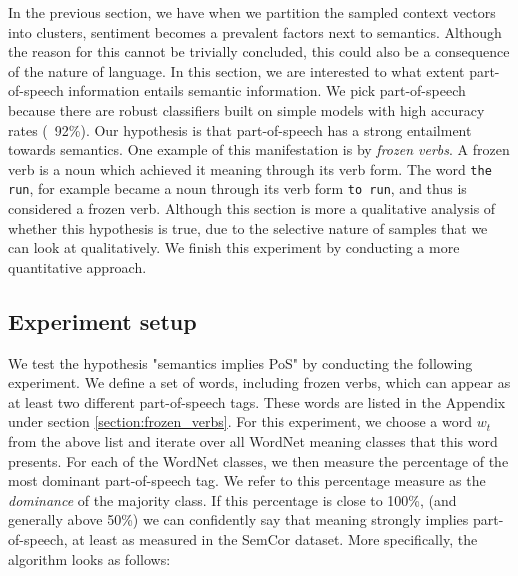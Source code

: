 \documentclass[a4paper,12pt,twoside,openright]{report}
\begin{document}
In the previous section, we have when we partition the sampled context vectors into clusters, sentiment becomes a prevalent factors next to semantics.
Although the reason for this cannot be trivially concluded, this could also be a consequence of the nature of language.
In this section, we are interested to what extent part-of-speech information entails semantic information.
We pick part-of-speech because there are robust classifiers built on simple models with high accuracy rates (~92\%).
Our hypothesis is that part-of-speech has a strong entailment towards semantics.
One example of this manifestation is by \textit{frozen verbs}.
A frozen verb is a noun which achieved it meaning through its verb form.
The word \Verb#the run#, for example became a noun through its verb form \Verb#to run#, and thus is considered a frozen verb.
Although this section is more a qualitative analysis of whether this hypothesis is true, due to the selective nature of samples that we can look at qualitatively.
We finish this experiment by conducting a more  quantitative approach.

\subsection{Experiment setup}

We test the hypothesis "semantics implies PoS" by conducting the following experiment.
We define a set of words, including frozen verbs, which can appear as at least two different part-of-speech tags.
These words are listed in the Appendix under section \eqref{section:frozen_verbs}.
For this experiment, we choose a word $w_t$ from the above list and iterate over all WordNet meaning classes that this word presents.
For each of the WordNet classes, we then measure the percentage of the most dominant part-of-speech tag.
We refer to this percentage measure as the \textit{dominance} of the majority class.
If this percentage is close to 100\%, (and generally above 50\%) we can confidently say that meaning strongly implies part-of-speech, at least as measured in the SemCor dataset.
More specifically, the algorithm looks as follows:
\end{document}
